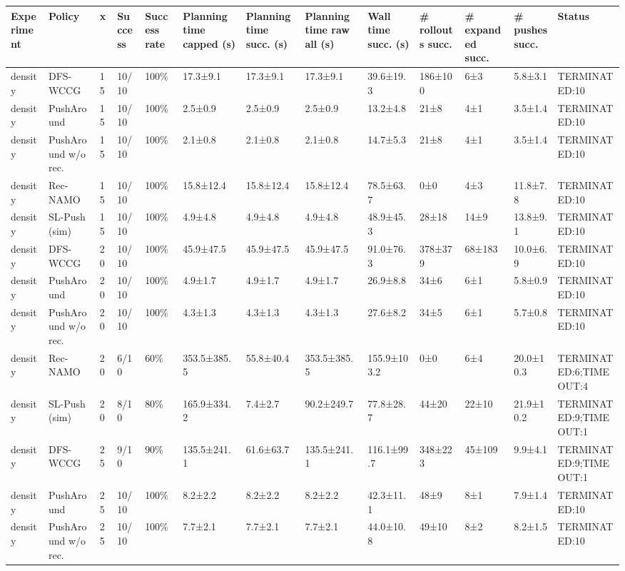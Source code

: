 \begin{tabular}{lllllllllllll}
\toprule
Experiment & Policy & x & Success & Success rate & Planning time capped (s) & Planning time succ. (s) & Planning time raw all (s) & Wall time succ. (s) & \# rollouts succ. & \# expanded succ. & \# pushes succ. & Status \\
\midrule
density & DFS-WCCG & 15 & 10/10 & 100\% & 17.3±9.1 & 17.3±9.1 & 17.3±9.1 & 39.6±19.3 & 186±100 & 6±3 & 5.8±3.1 & TERMINATED:10 \\
density & PushAround & 15 & 10/10 & 100\% & 2.5±0.9 & 2.5±0.9 & 2.5±0.9 & 13.2±4.8 & 21±8 & 4±1 & 3.5±1.4 & TERMINATED:10 \\
density & PushAround w/o rec. & 15 & 10/10 & 100\% & 2.1±0.8 & 2.1±0.8 & 2.1±0.8 & 14.7±5.3 & 21±8 & 4±1 & 3.5±1.4 & TERMINATED:10 \\
density & Rec-NAMO & 15 & 10/10 & 100\% & 15.8±12.4 & 15.8±12.4 & 15.8±12.4 & 78.5±63.7 & 0±0 & 4±3 & 11.8±7.8 & TERMINATED:10 \\
density & SL-Push (sim) & 15 & 10/10 & 100\% & 4.9±4.8 & 4.9±4.8 & 4.9±4.8 & 48.9±45.3 & 28±18 & 14±9 & 13.8±9.1 & TERMINATED:10 \\
density & DFS-WCCG & 20 & 10/10 & 100\% & 45.9±47.5 & 45.9±47.5 & 45.9±47.5 & 91.0±76.3 & 378±379 & 68±183 & 10.0±6.9 & TERMINATED:10 \\
density & PushAround & 20 & 10/10 & 100\% & 4.9±1.7 & 4.9±1.7 & 4.9±1.7 & 26.9±8.8 & 34±6 & 6±1 & 5.8±0.9 & TERMINATED:10 \\
density & PushAround w/o rec. & 20 & 10/10 & 100\% & 4.3±1.3 & 4.3±1.3 & 4.3±1.3 & 27.6±8.2 & 34±5 & 6±1 & 5.7±0.8 & TERMINATED:10 \\
density & Rec-NAMO & 20 & 6/10 & 60\% & 353.5±385.5 & 55.8±40.4 & 353.5±385.5 & 155.9±103.2 & 0±0 & 6±4 & 20.0±10.3 & TERMINATED:6;TIMEOUT:4 \\
density & SL-Push (sim) & 20 & 8/10 & 80\% & 165.9±334.2 & 7.4±2.7 & 90.2±249.7 & 77.8±28.7 & 44±20 & 22±10 & 21.9±10.2 & TERMINATED:9;TIMEOUT:1 \\
density & DFS-WCCG & 25 & 9/10 & 90\% & 135.5±241.1 & 61.6±63.7 & 135.5±241.1 & 116.1±99.7 & 348±223 & 45±109 & 9.9±4.1 & TERMINATED:9;TIMEOUT:1 \\
density & PushAround & 25 & 10/10 & 100\% & 8.2±2.2 & 8.2±2.2 & 8.2±2.2 & 42.3±11.1 & 48±9 & 8±1 & 7.9±1.4 & TERMINATED:10 \\
density & PushAround w/o rec. & 25 & 10/10 & 100\% & 7.7±2.1 & 7.7±2.1 & 7.7±2.1 & 44.0±10.8 & 49±10 & 8±2 & 8.2±1.5 & TERMINATED:10 \\

\end{tabular}
